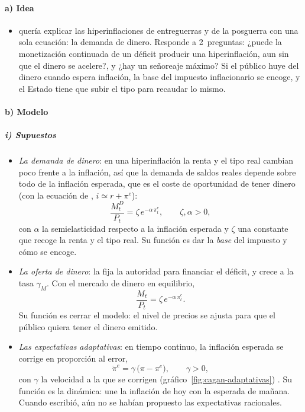 \documentclass[11pt]{article}
\begin{document}
\paragraph{a) Idea}

\begin{itemize}
\item \textcite{Cagan1956Monetary} quería explicar las hiperinflaciones de entreguerras y de la posguerra con una sola ecuación: la demanda de dinero. Responde a 2~preguntas: ¿puede la monetización continuada de un déficit producir una hiperinflación, aun sin que el dinero se acelere?, y ¿hay un señoreaje máximo? Si el público huye del dinero cuando espera inflación, la base del impuesto inflacionario se encoge, y el Estado tiene que subir el tipo para recaudar lo mismo.
\end{itemize}

\paragraph{b) Modelo}

\subparagraph{i) Supuestos}

\begin{itemize}
\item \emph{La demanda de dinero}: en una hiperinflación la renta y el tipo real cambian poco frente a la inflación, así que la demanda de saldos reales depende sobre todo de la inflación esperada, que es el coste de oportunidad de tener dinero (con la ecuación de , $i\simeq r+\pi^e$):
  \begin{equation}\label{eq:cagan}
  \frac{M^D_t}{P_t}=\zeta\,e^{-\alpha\,\pi^e_t},\qquad\zeta,\alpha>0,
  \end{equation}
  con $\alpha$ la semielasticidad respecto a la inflación esperada y $\zeta$ una constante que recoge la renta y el tipo real. Su función es dar la \emph{base} del impuesto y cómo se encoge.
\item \emph{La oferta de dinero}: la fija la autoridad para financiar el déficit, y crece a la tasa $\gamma_M$. Con el mercado de dinero en equilibrio,
  \begin{equation}\label{eq:cagan-equilibrio}
  \frac{M_t}{P_t}=\zeta\,e^{-\alpha\,\pi^e_t}.
  \end{equation}
  Su función es cerrar el modelo: el nivel de precios se ajusta para que el público quiera tener el dinero emitido.
\item \emph{Las expectativas adaptativas}: en tiempo continuo, la inflación esperada se corrige en proporción al error,
  \begin{equation}\label{eq:cagan-adaptativas}
  \dot\pi^e=\gamma\,\big(\pi-\pi^e\big),\qquad\gamma>0,
  \end{equation}
  con $\gamma$ la velocidad a la que se corrigen (gráfico~\ref{fig:cagan-adaptativas}) . Su función es la dinámica: une la inflación de hoy con la esperada de mañana. Cuando  escribió, aún no se habían propuesto las expectativas racionales.
\end{itemize}
\end{document}
